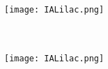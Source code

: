 \documentclass[12pt,letterpaper]{article}
\begin{document}
\begin{multicols}{2}
    \begin{minipage}[t][2in][c]{.45\textwidth}
    \centering
    \texttt{[image: IALilac.png]}\\ \vspace{.5cm}
    \huge \textbf{   }\\
    \vspace{0.5cm}
    \Large \textit{   } \\
    \vspace{0.5cm}
    \small  
    \end{minipage}
    \vspace{3cm}

    \begin{minipage}[t][2in][c]{.45\textwidth}
    \centering
    \texttt{[image: IALilac.png]}\\ \vspace{.5cm}
    \huge \textbf{   }\\
    \vspace{0.5cm}
    \Large \textit{   } \\
    \vspace{0.5cm}
    \small  
    \end{minipage}
    \vspace{3cm}
    
\end{multicols}
\end{document}
